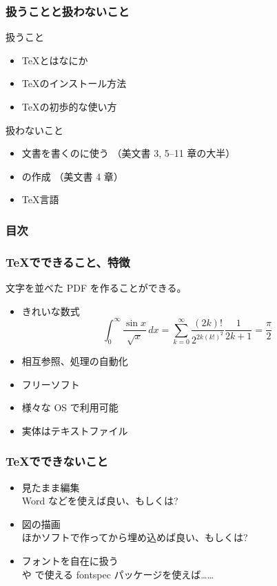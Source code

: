 \begin{frame}
	\frametitle{扱うことと扱わないこと}
	\begin{block}{扱うこと}
		\begin{itemize}
			\item \TeX とはなにか
			\item \TeX のインストール方法
			\item \TeX の初歩的な使い方
		\end{itemize}
	\end{block}
	\begin{block}{扱わないこと}
		\begin{itemize}
		\item 文書を書くのに使う
			{\nishikifont\small （美文書 3, 5--11 章の大半）}
		\item {}の作成
			{\nishikifont\small （美文書 4 章）}
		\item {}\TeX 言語 
		\end{itemize}
	\end{block}
\end{frame}

\begin{frame}
	\frametitle{目次}
	\setlength{\parskip}{0.5ex}
	\tableofcontents
\end{frame}


\begin{frame}
	\frametitle{\protect\TeX でできること、特徴}
	文字を並べた PDF を作ることができる。
	\pause
	\begin{itemize}
		\item きれいな数式
			\[\int_0^\infty \frac{\sin x}{\sqrt{x}}\,dx
			=\sum_{k=0}^\infty \frac{(2k)!}{2^{2k (k!)^2}}\frac{1}{2k+1}=\frac{\pi}{2}\]
		\item 相互参照、処理の自動化
		\item フリーソフト
		\item 様々な OS で利用可能
		\item 実体はテキストファイル
	\end{itemize}
\end{frame}

\begin{frame}
	\frametitle{\TeX でできないこと}
	\begin{itemize}
		\item 見たまま編集\\
			{\footnotesize Word などを使えば良い、もしくは\LyX?}
		\item 図の描画\\
			{\footnotesize ほかソフトで作ってから埋め込めば良い、もしくは\TikZ?}
		\item フォントを自在に扱う\\
			{\footnotesize \LuaTeX や \XeTeX で使える fontspec パッケージを使えば……}
	\end{itemize}
\end{frame}

